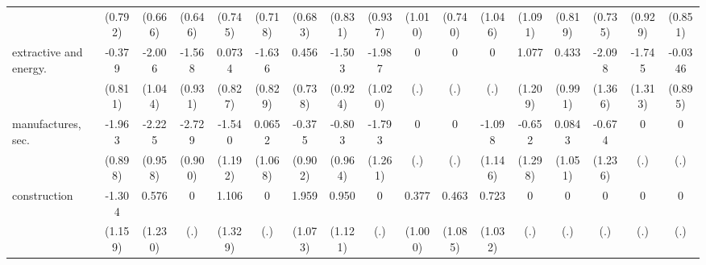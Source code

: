 {\begin{tabular}{l*{16}{c}}
                    &     (0.792)         &     (0.666)         &     (0.646)         &     (0.745)         &     (0.718)         &     (0.683)         &     (0.831)         &     (0.937)         &     (1.010)         &     (0.740)         &     (1.046)         &     (1.091)         &     (0.819)         &     (0.735)         &     (0.929)         &     (0.851)         \\
[1em]
extractive and energy.&      -0.379         &      -2.006         &      -1.568         &      0.0734         &      -1.636\sym{*}  &       0.456         &      -1.503         &      -1.987         &           0         &           0         &           0         &       1.077         &       0.433         &      -2.098         &      -1.745         &     -0.0346         \\
                    &     (0.811)         &     (1.044)         &     (0.931)         &     (0.827)         &     (0.829)         &     (0.738)         &     (0.924)         &     (1.020)         &         (.)         &         (.)         &         (.)         &     (1.209)         &     (0.991)         &     (1.366)         &     (1.313)         &     (0.895)         \\
[1em]
manufactures, sec.  &      -1.963\sym{*}  &      -2.225\sym{*}  &      -2.729\sym{**} &      -1.540         &      0.0652         &      -0.375         &      -0.803         &      -1.793         &           0         &           0         &      -1.098         &      -0.652         &      0.0843         &      -0.674         &           0         &           0         \\
                    &     (0.898)         &     (0.958)         &     (0.900)         &     (1.192)         &     (1.068)         &     (0.902)         &     (0.964)         &     (1.261)         &         (.)         &         (.)         &     (1.146)         &     (1.298)         &     (1.051)         &     (1.236)         &         (.)         &         (.)         \\
[1em]
construction        &      -1.304         &       0.576         &           0         &       1.106         &           0         &       1.959         &       0.950         &           0         &       0.377         &       0.463         &       0.723         &           0         &           0         &           0         &           0         &           0         \\
                    &     (1.159)         &     (1.230)         &         (.)         &     (1.329)         &         (.)         &     (1.073)         &     (1.121)         &         (.)         &     (1.000)         &     (1.085)         &     (1.032)         &         (.)         &         (.)         &         (.)         &         (.)         &         (.)         \\

\end{tabular}}

